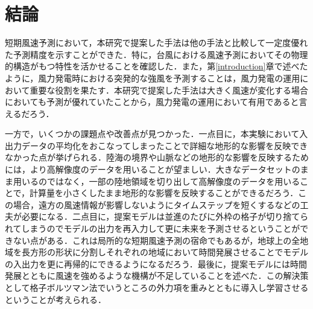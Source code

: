 \chapter{結論}

短期風速予測において，本研究で提案した手法は他の手法と比較して一定度優れた予測精度を示すことができた．特に，台風における風速予測においてその物理的構造がもつ特性を活かせることを確認した．また，第\ref{introduction}章で述べたように，風力発電時における突発的な強風を予測することは，風力発電の運用において重要な役割を果たす．本研究で提案した手法は大きく風速が変化する場合においても予測が優れていたことから，風力発電の運用において有用であると言えるだろう．

一方で，いくつかの課題点や改善点が見つかった．一点目に，本実験において入出力データの平均化をおこなってしまったことで詳細な地形的な影響を反映できなかった点が挙げられる．陸海の境界や山脈などの地形的な影響を反映するためには，より高解像度のデータを用いることが望ましい．大きなデータセットのまま用いるのではなく，一部の陸地領域を切り出して高解像度のデータを用いることで，計算量を小さくしたまま地形的な影響を反映することができるだろう．この場合，遠方の風速情報が影響しないようにタイムステップを短くするなどの工夫が必要になる．二点目に，提案モデルは並進のたびに外枠の格子が切り捨てられてしまうのでモデルの出力を再入力して更に未来を予測させるということができない点がある．これは局所的な短期風速予測の宿命でもあるが，地球上の全地域を長方形の形状に分割しそれぞれの地域において時間発展させることでモデルの入出力を更に再帰的にできるようになるだろう．最後に，提案モデルには時間発展とともに風速を強めるような機構が不足していることを述べた．この解決策として格子ボルツマン法でいうところの外力項\cite{Inamuro2020}を重みとともに導入し学習させるということが考えられる．
